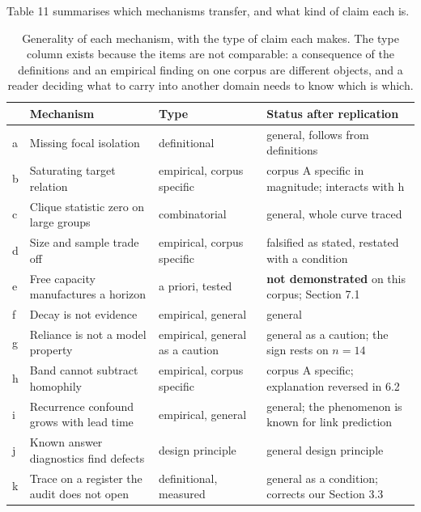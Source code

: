 \documentclass[twoside,11pt]{article}
\begin{document}
Table 11 summarises which mechanisms transfer, and what kind of claim each is.

\begin{table}[!htbp]
\centering
\small
\begin{tabular}{@{}
  >{\raggedright\arraybackslash}p{}
  >{\raggedright\arraybackslash}p{}
  >{\raggedright\arraybackslash}p{}
  >{\raggedright\arraybackslash}p{}@{}}
\toprule
\begin{minipage}[b]{\linewidth}\raggedright
\end{minipage} & \begin{minipage}[b]{\linewidth}\raggedright
\textbf{Mechanism}
\end{minipage} & \begin{minipage}[b]{\linewidth}\raggedright
\textbf{Type}
\end{minipage} & \begin{minipage}[b]{\linewidth}\raggedright
\textbf{Status after replication}
\end{minipage} \\
\midrule
a & Missing focal isolation & definitional & general, follows from definitions \\
b & Saturating target relation & empirical, corpus specific & corpus A specific in magnitude; interacts with h \\
c & Clique statistic zero on large groups & combinatorial & general, whole curve traced \\
d & Size and sample trade off & empirical, corpus specific & falsified as stated, restated with a condition \\
e & Free capacity manufactures a horizon & a priori, tested & \textbf{not demonstrated} on this corpus; Section 7.1 \\
f & Decay is not evidence & empirical, general & general \\
g & Reliance is not a model property & empirical, general as a caution & general as a caution; the sign rests on \(n = 14\) \\
h & Band cannot subtract homophily & empirical, corpus specific & corpus A specific; explanation reversed in 6.2 \\
i & Recurrence confound grows with lead time & empirical, general & general; the phenomenon is known for link prediction \citep{poursafaei} \\
j & Known answer diagnostics find defects & design principle & general design principle \\
k & Trace on a register the audit does not open & definitional, measured & general as a condition; corrects our Section 3.3 \\
\bottomrule
\end{tabular}
\caption{Generality of each mechanism, with the type of claim each makes. The type column exists because the items are not comparable: a consequence of the definitions and an empirical finding on one corpus are different objects, and a reader deciding what to carry into another domain needs to know which is which.}\label{tab:11}
\end{table}
\end{document}

